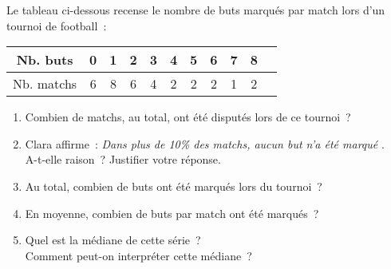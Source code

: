 
%
Le tableau ci-dessous recense le nombre de buts marqués par match lors d'un tournoi de football~:
\begin{center}
     \begin{tabular}{|c|c|c|c|c|c|c|c|c|c|c|} %
          \hline
          Nb. buts   &  0 & 1 & 2 & 3 & 4 & 5 & 6 & 7 & 8
          \\ \hline
          Nb. matchs     &  6 & 8 & 6 & 4 & 2 & 2 & 2 & 1 & 2
          \\ \hline
     \end{tabular}
\end{center}
\begin{enumerate}
     \item %
     Combien de matchs, au total, ont été disputés lors de ce tournoi~?
     \item %
     Clara affirme~:
     \textit{\og Dans plus de 10\% des matchs, aucun but n'a été marqué \fg{}}.
\\
     A-t-elle raison~? Justifier votre réponse.
     \item %
     Au total, combien de buts ont été marqués lors du tournoi~?
     \item %
     En moyenne, combien de buts par match ont été marqués~?
     \item %
     Quel est la médiane de cette série~?\\
     Comment peut-on interpréter cette médiane~?
\end{enumerate}
